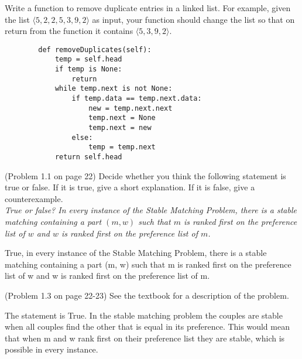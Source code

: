 \documentclass[11pt,addpoints]{exam}
\begin{document}
\begin{questions}
\ifprintanswers
\newpage
\else
\bigskip
\fi


\question[10]
Write a function to remove duplicate entries in a linked list.  For example, given the list $\langle 5, 2, 2, 5, 3, 9, 2 \rangle$ as input, your function should change the list so that on return from the function it contains $\langle 5, 3, 9, 2 \rangle$.

\begin{solutionorbox}
	\begin{lstlisting}
		def removeDuplicates(self): 
			temp = self.head 
			if temp is None: 
				return
			while temp.next is not None: 
				if temp.data == temp.next.data: 
					new = temp.next.next
					temp.next = None
					temp.next = new 
				else: 
					temp = temp.next
			return self.head
	\end{lstlisting}
\end{solutionorbox}

\ifprintanswers
\newpage
\else
\bigskip
\fi


\question[10]
(Problem 1.1 on page 22)  Decide whether you think the following statement is true or false.  If it is true, give a short explanation.  If it is false, give a counterexample.\\

\textit{True or false?  In every instance of the Stable Matching Problem, there is a stable matching containing a part $(m,w)$ such that $m$ is ranked first on the preference list of $w$ and $w$ is ranked first on the preference list of $m$.}

\begin{solutionorbox}
True, in every instance of the Stable Matching Problem, there is a stable matching containing a part (m, w) such that m is ranked first on the preference list of w and w is ranked first on the preference list of m.
\end{solutionorbox}

\ifprintanswers
\newpage
\else
\bigskip
\fi


\question[10]
(Problem 1.3 on page 22-23)  See the textbook for a description of the problem.

\begin{solutionorbox}
	The statement is True. In the stable matching problem the couples are stable when all couples find the other that is equal in its preference. This would mean that when m and w rank first on their preference list they are stable, which is possible in every instance.
\end{solutionorbox}

\ifprintanswers
\newpage
\else
\bigskip
\fi


%
\end{questions}
\end{document}
